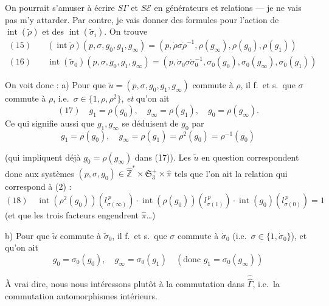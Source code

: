 \documentclass[11pt,a4paper]{article}
\begin{document}
On pourrait s'amuser à écrire $S\Gamma$ et $S\mathcal{E}$ en générateurs et
relations --- je ne vais pas m'y attarder. Par contre, je vais donner des
formules pour l'action de $\operatorname{int}(\tilde\rho)$ et des
$\operatorname{int}(\tilde\sigma_i)$. On trouve
\[
\begin{aligned}
(15)&\quad (\operatorname{int}\tilde\rho)(p, \sigma, g_0, g_1, g_\infty) =
(p, \dot\rho\sigma\dot\rho^{-1}, \rho(g_\infty), \rho(g_0), \rho(g_1))\\
(16)&\quad \operatorname{int}(\tilde\sigma_0)(p, \sigma, g_0, g_1, g_\infty) =
(p, \dot\sigma_0\sigma\dot\sigma_0^{-1}, \sigma_0(g_0), \sigma_0(g_\infty),
\sigma_0(g_1))
\end{aligned}
\]

On voit donc : a) Pour que $\tilde u = (p, \sigma, g_0, g_1, g_\infty)$
commute à $\rho$, il f.\ et s.\ que 
$\sigma$ commute à $\rho$, i.e.\ $\sigma \in \{1, \rho, \rho^{2}\}$,
\emph{et} qu'on ait
\[
(17)\quad g_1 = \rho(g_0), \quad g_\infty = \rho(g_1), \quad g_0 =
\rho(g_\infty) .
\]
Ce qui signifie aussi que $g_1, g_\infty$ se déduisent de $g_0$ par
\[
g_1 = \rho(g_0), \quad g_\infty = \rho(g_1) = \rho^{2}(g_0) =
\rho^{-1}(g_0)
\]


(qui impliquent déjà $g_0 = \rho(g_\infty)$ dans (17)). Les $\tilde u$ en
question correspondent donc aux systèmes $(p, \sigma, g_0) \in
\hat{\mathbb{Z}}^{*} \times \mathfrak{S}_3^{+} \times \hat\pi$ tels que l'on
ait la relation qui correspond à (2) :
\[
(18)\quad \operatorname{int}(\rho^{2}(g_0))(l_{\sigma(\infty)}^{\,p}) \cdot
\operatorname{int}(\rho(g_0))(l_{\sigma(1)}^{\,p}) \cdot
\operatorname{int}(g_0)(l_{\sigma(0)}^{\,p}) = 1
\]
(et que les trois facteurs engendrent $\hat\pi$…)

b) Pour que $\tilde u$ commute à $\tilde\sigma_0$, il f.\ et s.\ que
$\sigma$ commute à $\dot\sigma_0$ (i.e.\ $\sigma \in \{1, \dot\sigma_0\}$),
et qu'on ait
\[
g_0 = \sigma_0(g_0), \quad g_\infty = \sigma_0(g_1) \quad (\text{donc } g_1 =
\sigma_0(g_\infty))
\]
\struck{\ill{}} \struck{\ill{}}


À vrai dire, nous nous intéressons plutôt à la commutation dans
$\hat{\hat\Gamma}$, i.e.\ la commutation  automorphismes
intérieurs.
\end{document}
